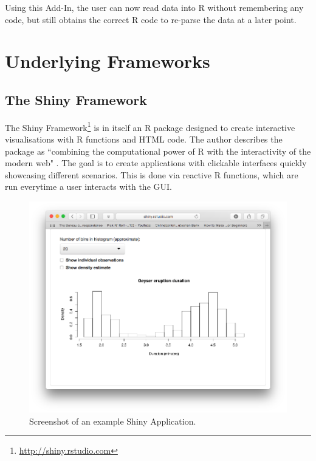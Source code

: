 \documentclass[12pt]{article} %
\begin{document}
Using this Add-In, the user can now read data into R without remembering any code, but still obtains the correct R code to re-parse the data at a later point. 

\section{Underlying Frameworks}

\subsection{The Shiny Framework}

The Shiny Framework\footnote{\url{http://shiny.rstudio.com}} is in itself an R package designed to create interactive visualisations with R functions and HTML code. The author describes the package as ``combining the computational power of R with the interactivity of the modern web" \cite[RStudio 2016]{w3}. The goal is to create applications with clickable interfaces quickly showcasing different scenarios. This is done via reactive R functions, which are run everytime a user interacts with the GUI. 

\begin{figure}[h]
\begin{centering}
\includegraphics[scale = 0.5, trim = 50 50 50 100]{figures/example_shiny_app.png}
\caption{Screenshot of an example Shiny Application.}
\label{exampleapp}
\end{centering}
\end{figure}
\end{document}
